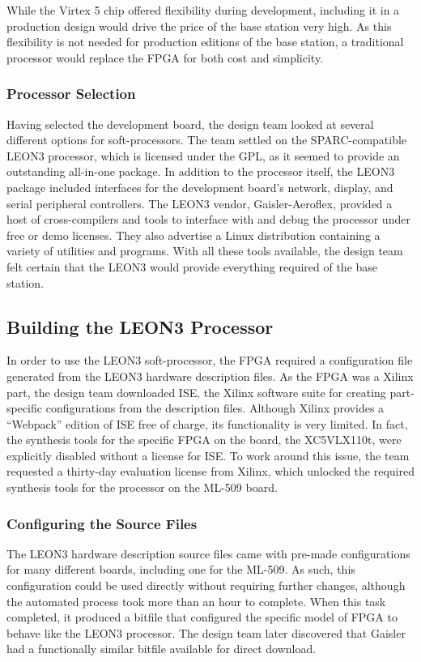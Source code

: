 While the Virtex 5 chip offered flexibility during development, including
it in a production design would drive the price of the base station very
high. As this flexibility is not needed for  production editions of the
base station, a traditional processor would replace the \ac{FPGA} for both
cost and simplicity.

\subsubsection{Processor Selection}
Having selected the development board, the design team looked at several
different options for soft-processors. The team settled on the
SPARC-compatible LEON3 processor, which is licensed under the \ac{GPL}, as
it seemed to provide an outstanding all-in-one package. In addition to the
processor itself, the LEON3 package included interfaces for the development
board's network, display, and serial peripheral controllers. The LEON3
vendor, Gaisler-Aeroflex, provided a host of cross-compilers and tools to
interface with and debug the processor under free or demo licenses. They
also advertise a Linux distribution containing a variety of utilities and
programs. With all these tools available, the design team felt certain that
the LEON3 would provide everything required of the base station.

\subsection{Building the LEON3 Processor}
In order to use the LEON3 soft-processor, the \ac{FPGA} required a
configuration file generated from the LEON3 hardware description files. As
the \ac{FPGA} was a Xilinx part, the design team downloaded ISE, the Xilinx
software suite for creating part-specific configurations from the
description files. Although Xilinx provides a ``Webpack'' edition of ISE
free of charge, its functionality is very limited. In fact, the synthesis
tools for the specific \ac{FPGA} on the board, the XC5VLX110t, were
explicitly disabled without a license for ISE. To work around this issue,
the team requested a thirty-day evaluation license from Xilinx, which
unlocked the required synthesis tools for the processor on the ML-509
board.

\subsubsection{Configuring the Source Files}
The LEON3 hardware description source files came with pre-made
configurations for many different boards, including one for the ML-509. As
such, this configuration could be used directly without requiring further
changes, although the automated process took more than an hour to
complete. When this task completed, it produced a bitfile that configured
the specific model of \ac{FPGA} to behave like the LEON3 processor. The
design team later discovered that Gaisler had a functionally similar
bitfile available for direct download.

